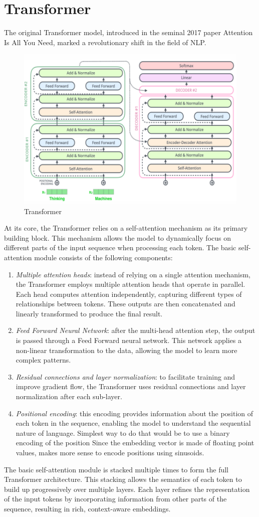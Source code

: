 \section{Transformer}

The original Transformer model, introduced in the seminal 2017 paper Attention Is All You Need, marked a revolutionary shift in the field of NLP. 
\begin{figure}[H]
    \centering
    \includegraphics[width=0.5\linewidth]{images/nlp6.png}
    \caption{Transformer}
\end{figure}
At its core, the Transformer relies on a self-attention mechanism as its primary building block. 
This mechanism allows the model to dynamically focus on different parts of the input sequence when processing each token. 
The basic self-attention module consists of the following components:
\begin{enumerate}
    \item \textit{Multiple attention heads}: instead of relying on a single attention mechanism, the Transformer employs multiple attention heads that operate in parallel. 
        Each head computes attention independently, capturing different types of relationships between tokens. 
        These outputs are then concatenated and linearly transformed to produce the final result.
    \item \textit{Feed Forward Neural Network}: after the multi-head attention step, the output is passed through a Feed Forward neural network. 
        This network applies a non-linear transformation to the data, allowing the model to learn more complex patterns.
    \item \textit{Residual connections and layer normalization}: to facilitate training and improve gradient flow, the Transformer uses residual connections and layer normalization after each sub-layer. 
    \item \textit{Positional encoding}: this encoding provides information about the position of each token in the sequence, enabling the model to understand the sequential nature of language.
        Simplest way to do that would be to use a binary encoding of the position
        Since the embedding vector is made of floating point values, makes more sense to encode positions using sinusoids.
\end{enumerate}
\noindent The basic self-attention module is stacked multiple times to form the full Transformer architecture. This stacking allows the semantics of each token to build up progressively over multiple layers.
Each layer refines the representation of the input tokens by incorporating information from other parts of the sequence, resulting in rich, context-aware embeddings.


